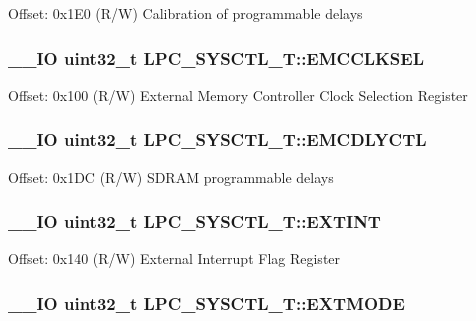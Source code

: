 Offset\+: 0x1\+E0 (R/\+W) Calibration of programmable delays \hypertarget{struct_l_p_c___s_y_s_c_t_l___t_a23152315a7ac650737bf1b3852bab194}{
\subsubsection[{E\+M\+C\+C\+L\+K\+S\+E\+L}]{\setlength{\rightskip}{0pt plus 5cm}\+\_\+\+\_\+\+I\+O uint32\+\_\+t L\+P\+C\+\_\+\+S\+Y\+S\+C\+T\+L\+\_\+\+T\+::\+E\+M\+C\+C\+L\+K\+S\+E\+L}}\label{struct_l_p_c___s_y_s_c_t_l___t_a23152315a7ac650737bf1b3852bab194}
Offset\+: 0x100 (R/\+W) External Memory Controller Clock Selection Register \hypertarget{struct_l_p_c___s_y_s_c_t_l___t_a3976afa12c3ebc2e7acfe59aef82acc4}{
\subsubsection[{E\+M\+C\+D\+L\+Y\+C\+T\+L}]{\setlength{\rightskip}{0pt plus 5cm}\+\_\+\+\_\+\+I\+O uint32\+\_\+t L\+P\+C\+\_\+\+S\+Y\+S\+C\+T\+L\+\_\+\+T\+::\+E\+M\+C\+D\+L\+Y\+C\+T\+L}}\label{struct_l_p_c___s_y_s_c_t_l___t_a3976afa12c3ebc2e7acfe59aef82acc4}
Offset\+: 0x1\+D\+C (R/\+W) S\+D\+R\+A\+M programmable delays \hypertarget{struct_l_p_c___s_y_s_c_t_l___t_ac394af46f7dc8a036a574980c62ff769}{
\subsubsection[{E\+X\+T\+I\+N\+T}]{\setlength{\rightskip}{0pt plus 5cm}\+\_\+\+\_\+\+I\+O uint32\+\_\+t L\+P\+C\+\_\+\+S\+Y\+S\+C\+T\+L\+\_\+\+T\+::\+E\+X\+T\+I\+N\+T}}\label{struct_l_p_c___s_y_s_c_t_l___t_ac394af46f7dc8a036a574980c62ff769}
Offset\+: 0x140 (R/\+W) External Interrupt Flag Register \hypertarget{struct_l_p_c___s_y_s_c_t_l___t_a22607cf2c4669efe70eae5746f74a33c}{
\subsubsection[{E\+X\+T\+M\+O\+D\+E}]{\setlength{\rightskip}{0pt plus 5cm}\+\_\+\+\_\+\+I\+O uint32\+\_\+t L\+P\+C\+\_\+\+S\+Y\+S\+C\+T\+L\+\_\+\+T\+::\+E\+X\+T\+M\+O\+D\+E}}\label{struct_l_p_c___s_y_s_c_t_l___t_a22607cf2c4669efe70eae5746f74a33c}
